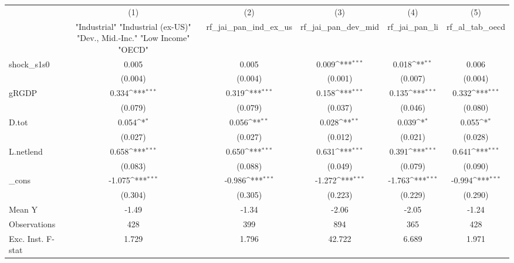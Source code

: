 {
\def\sym#1{\ifmmode^{#1}\else\(^{#1}\)\fi}
\begin{tabular}{l*{5}{c}}
\toprule
            &\multicolumn{1}{c}{(1)}&\multicolumn{1}{c}{(2)}&\multicolumn{1}{c}{(3)}&\multicolumn{1}{c}{(4)}&\multicolumn{1}{c}{(5)}\\
            &\multicolumn{1}{c}{ "Industrial" "Industrial (ex-US)" "Dev., Mid.-Inc." "Low Income" "OECD" }&\multicolumn{1}{c}{rf\_jai\_pan\_ind\_ex\_us}&\multicolumn{1}{c}{rf\_jai\_pan\_dev\_mid}&\multicolumn{1}{c}{rf\_jai\_pan\_li}&\multicolumn{1}{c}{rf\_al\_tab\_oecd}\\
\midrule
shock\_s1s0  &       0.005         &       0.005         &       0.009\sym{***}&       0.018\sym{**} &       0.006         \\
            &     (0.004)         &     (0.004)         &     (0.001)         &     (0.007)         &     (0.004)         \\
\addlinespace
gRGDP       &       0.334\sym{***}&       0.319\sym{***}&       0.158\sym{***}&       0.135\sym{***}&       0.332\sym{***}\\
            &     (0.079)         &     (0.079)         &     (0.037)         &     (0.046)         &     (0.080)         \\
\addlinespace
D.tot       &       0.054\sym{*}  &       0.056\sym{**} &       0.028\sym{**} &       0.039\sym{*}  &       0.055\sym{*}  \\
            &     (0.027)         &     (0.027)         &     (0.012)         &     (0.021)         &     (0.028)         \\
\addlinespace
L.netlend   &       0.658\sym{***}&       0.650\sym{***}&       0.631\sym{***}&       0.391\sym{***}&       0.641\sym{***}\\
            &     (0.083)         &     (0.088)         &     (0.049)         &     (0.079)         &     (0.090)         \\
\addlinespace
\_cons      &      -1.075\sym{***}&      -0.986\sym{***}&      -1.272\sym{***}&      -1.763\sym{***}&      -0.994\sym{***}\\
            &     (0.304)         &     (0.305)         &     (0.223)         &     (0.229)         &     (0.290)         \\
\midrule
Mean Y      &       -1.49         &       -1.34         &       -2.06         &       -2.05         &       -1.24         \\
Observations&         428         &         399         &         894         &         365         &         428         \\
Exc. Inst. F-stat&       1.729         &       1.796         &      42.722         &       6.689         &       1.971         \\
\bottomrule
\end{tabular}
}
